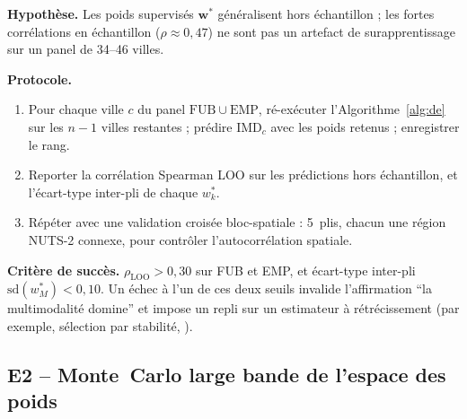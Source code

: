 \documentclass[11pt,a4paper]{article}
\newcommand{\IMD}{\mathrm{IMD}}
\begin{document}
\begin{experience}[title=E1 -- Leave-one-city-out et CV bloc-spatiale]
\textbf{Hypothèse.} Les poids supervisés $\mathbf{w}^{\ast}$
généralisent hors échantillon ; les fortes corrélations en
échantillon ($\rho \approx 0{,}47$) ne sont pas un artefact de
surapprentissage sur un panel de 34--46 villes.

\textbf{Protocole.}
\begin{enumerate}[leftmargin=*,itemsep=0.2em]
    \item Pour chaque ville $c$ du panel
    $\mathrm{FUB}\cup\mathrm{EMP}$, ré-exécuter
    l'Algorithme~\ref{alg:de} sur les $n-1$ villes restantes ;
    prédire $\IMD_c$ avec les poids retenus ; enregistrer le rang.
    \item Reporter la corrélation Spearman LOO sur les prédictions
    hors échantillon, et l'écart-type inter-pli de chaque
    $w_k^{\ast}$.
    \item Répéter avec une validation croisée bloc-spatiale
    \citep{Roberts2017, Pohjankukka2017} : 5~plis, chacun une
    région NUTS-2 connexe, pour contrôler l'autocorrélation
    spatiale.
\end{enumerate}

\textbf{Critère de succès.}
$\rho_{\text{LOO}} > 0{,}30$ sur FUB et EMP, et écart-type
inter-pli $\mathrm{sd}(w_M^{\ast}) < 0{,}10$. Un échec à l'un de
ces deux seuils invalide l'affirmation \enquote{la multimodalité
domine} et impose un repli sur un estimateur à rétrécissement
(par exemple, sélection par stabilité, \citealp{Meinshausen2010}).
\end{experience}

\subsection{E2 -- Monte~Carlo large bande de l'espace des poids}
\label{sec:exp-mc}
\end{document}
